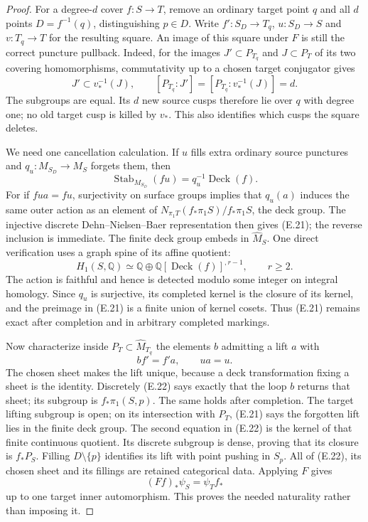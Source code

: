 \begin{proof}
For a degree-$d$ cover $f:S\to T$, remove an ordinary target
point $q$ and all $d$ points $D=f^{-1}(q)$, distinguishing
$p\in D$.  Write $f':S_D\to T_q$, $u:S_D\to S$ and
$v:T_q\to T$ for the resulting square.  An image of this
square under $F$ is still the correct puncture pullback.
Indeed, for the images $J'\subset P_{T_q}$ and $J\subset P_T$
of its two covering homomorphisms, commutativity up to a
chosen target conjugator gives
\[
 J'\subset v_*^{-1}(J),\qquad
 [P_{T_q}:J']=[P_{T_q}:v_*^{-1}(J)]=d.
\]
The subgroups are equal.  Its $d$ new source cusps therefore
lie over $q$ with degree one; no old target cusp is killed by
$v_*$.  This also identifies which cusps the square deletes.

We need one cancellation calculation.  If $u$ fills extra
ordinary source punctures and $q_u:M_{S_D}\to M_S$ forgets
them, then
\[
 \operatorname{Stab}_{M_{S_D}}(fu)
                  =q_u^{-1}\operatorname{Deck}(f).        \tag{E.21}
\]
For if $fu a=fu$, surjectivity on surface groups implies that
$q_u(a)$ induces the same outer action as an element of
$N_{\pi_1T}(f_*\pi_1S)/f_*\pi_1S$, the deck group.
The injective discrete Dehn--Nielsen--Baer representation
then gives (E.21); the reverse inclusion is immediate.
The finite deck group embeds in $\widehat M_S$.  One direct
verification uses a graph spine of its affine quotient:
\[
 H_1(S,\mathbb Q)\simeq\mathbb Q\oplus
     \mathbb Q[\operatorname{Deck}(f)]^{,r-1},\qquad r\geq2.
\]
The action is faithful and hence is detected modulo some
integer on integral homology.  Since $q_u$ is surjective,
its completed kernel is the closure of its kernel, and the
preimage in (E.21) is a finite union of kernel cosets.  Thus
(E.21) remains exact after completion and in arbitrary
completed markings.

Now characterize inside $P_T\subset\widehat M_{T_q}$ the
elements $b$ admitting a lift $a$ with
\[
                  b f'=f'a,\qquad ua=u.                  \tag{E.22}
\]
The chosen sheet makes the lift unique, because a deck
transformation fixing a sheet is the identity.  Discretely
(E.22) says exactly that the loop $b$ returns that sheet;
its subgroup is $f_*\pi_1(S,p)$.  The same holds after
completion.  The target lifting subgroup is open; on its
intersection with $P_T$, (E.21) says the forgotten lift lies
in the finite deck group.  The second equation in (E.22)
is the kernel of that finite continuous quotient.  Its
discrete subgroup is dense, proving that its closure is
$f_*P_S$.  Filling $D\setminus\{p\}$ identifies its lift
with point pushing in $S_p$.
All of (E.22), its chosen sheet and its fillings are retained
categorical data.  Applying $F$ gives
\[
                  (Ff)_*\psi_S=\psi_T f_*                \tag{E.23}
\]
up to one target inner automorphism.  This proves the needed
naturality rather than imposing it.


\end{proof}

